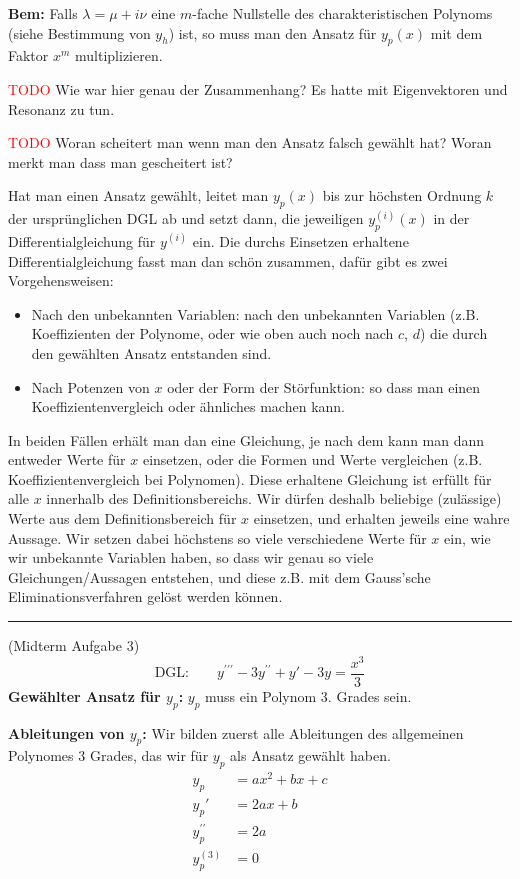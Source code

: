 \documentclass[a4paper,landscape,8pt]{extarticle}
\newcommand{\todo}{\textcolor{red}{TODO }}
\newcommand{\sep}{\vspace{5pt}\noindent\hrule\vspace{5pt}}
\newcommand{\Bem}{\textbf{Bem: }}
\begin{document}
\begin{multicols*}{4}
\begin{warmup}
\begin{warmup}
\Bem Falls $\lambda=\mu + i\nu$ eine $m$-fache Nullstelle des charakteristischen
Polynoms (siehe Bestimmung von $y_h$) ist, so muss man den Ansatz für $y_p(x)$
mit dem Faktor $x^m$ multiplizieren. 

\todo Wie war hier genau der Zusammenhang? Es hatte mit Eigenvektoren und
Resonanz zu tun.

\todo Woran scheitert man wenn man den Ansatz falsch gewählt hat? Woran merkt
man dass man gescheitert ist?

Hat man einen Ansatz gewählt, leitet man $y_p(x)$ bis zur höchsten Ordnung $k$
der ursprünglichen DGL ab und setzt dann, die jeweiligen $y^{(i)}_p(x)$ in der
Differentialgleichung für $y^{(i)}$ ein. Die durchs Einsetzen erhaltene
Differentialgleichung fasst man dan schön zusammen, dafür gibt es zwei
Vorgehensweisen:
\begin{itemize}
  \item Nach den unbekannten Variablen: nach den unbekannten Variablen (z.B.
  Koeffizienten der Polynome, oder wie oben auch noch nach $c$, $d$) die durch
   den gewählten Ansatz entstanden
sind.
\item Nach Potenzen von $x$ oder der Form der Störfunktion: so dass man einen
 Koeffizientenvergleich oder ähnliches machen kann.
\end{itemize}

In beiden Fällen erhält man dan eine Gleichung, je nach dem kann man dann
entweder Werte für $x$ einsetzen, oder die Formen und Werte vergleichen (z.B.
Koeffizientenvergleich bei Polynomen). Diese erhaltene Gleichung ist erfüllt für
alle $x$ innerhalb des Definitionsbereichs. Wir dürfen deshalb beliebige
(zulässige) Werte aus dem Definitionsbereich für $x$ einsetzen, und erhalten
jeweils eine wahre Aussage. Wir setzen dabei höchstens so viele verschiedene
Werte für $x$ ein, wie wir unbekannte Variablen haben, so dass wir genau so
viele Gleichungen/Aussagen entstehen, und diese z.B. mit dem Gauss'sche
Eliminationsverfahren gelöst werden können.

\sep

\Bsp (Midterm Aufgabe 3)
\[
\text{DGL:} \qquad y^{\prime\prime\prime}-3y^{\prime\prime}+y'-3y = \frac{x^3}{3}
\]
\textbf{Gewählter Ansatz für $y_p$:} $y_p$ muss ein Polynom 3. Grades sein.

\textbf{Ableitungen von $y_p$:} Wir bilden zuerst alle Ableitungen des
allgemeinen Polynomes 3 Grades, das wir für $y_p$ als Ansatz gewählt haben.
\begin{align*}
y_p   &= ax^2+bx+c\\
y_p'  &= 2ax + b\\
y_p^{\prime\prime} &= 2a\\
y_p^{(3)} &= 0
\end{align*}


\end{warmup}
\end{warmup}
\end{multicols*}
\end{document}
